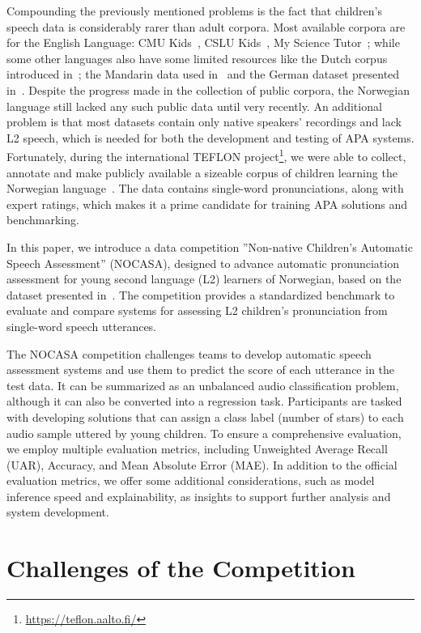 \documentclass{article}
\begin{document}
Compounding the previously mentioned problems is the fact that children's speech data is considerably rarer than adult corpora. Most available corpora are for the English Language: CMU Kids~\cite{cmukids}, CSLU Kids~\cite{cslukids}, My Science Tutor~\cite{myst};  while some other languages also have some limited resources like the Dutch corpus introduced in~\cite{jasminlr}; the Mandarin data used in~\cite{slt21lr} and the German dataset presented in~\cite{kidstalk}. Despite the progress made in the collection of public corpora, the Norwegian language still lacked any such public data until very recently. 
An additional problem is that most datasets contain only native speakers' recordings and lack L2 speech, which is needed for both the development and testing of APA systems. Fortunately, during the international TEFLON project\footnote{\url{https://teflon.aalto.fi/}}, we were able to collect, annotate and make publicly available a sizeable corpus of children learning the Norwegian language~\cite{TeflonDataLREC2024}. The data contains single-word pronunciations, along with expert ratings, which makes it a prime candidate for training APA solutions and benchmarking.   

In this paper, we introduce a data competition ”Non-native Children’s Automatic
Speech Assessment” (NOCASA), designed to advance automatic pronunciation assessment for young second language (L2) learners of Norwegian, based on the dataset presented in~\cite{TeflonDataLREC2024}. The competition provides a standardized benchmark to evaluate and compare systems for assessing L2 children's pronunciation from single-word speech utterances. 

The NOCASA competition challenges teams to develop automatic speech assessment systems and use them to predict the score of each utterance in the test data. It can be summarized as an unbalanced audio classification problem, although it can also be converted into a regression task. Participants are tasked with developing solutions that can assign a class label (number of stars) to each audio sample uttered by young children. To ensure a comprehensive evaluation, we employ multiple evaluation metrics, including Unweighted Average Recall (UAR), Accuracy, and Mean Absolute Error (MAE). In addition to the official evaluation metrics, we offer some additional considerations, such as model inference speed and explainability, as insights to support further analysis and system development.

\section{Challenges of the Competition}
\label{sec:goal}
\end{document}
